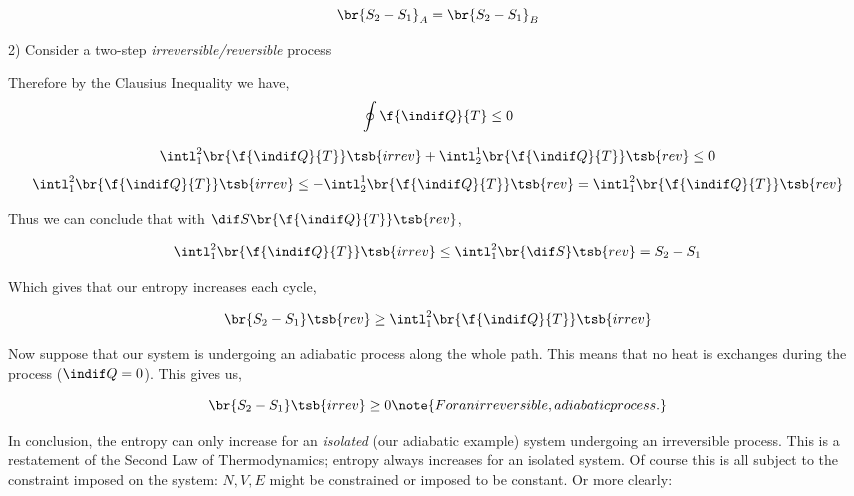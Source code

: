 \documentclass{article}
\begin{document}
\[ \br{S_2 - S_1}_A = \br{S_2 - S_1}_B \]

2) Consider a two-step \textit{irreversible/reversible} process

\begin{center}
\end{center}

Therefore by the Clausius Inequality we have,
\[ \oint \f{\indif Q}{T} \leq 0 \]

\[ \intl_1^2 \br{\f{\indif Q}{T}}\tsb{irrev} + \intl_2^1 \br{\f{\indif Q}{T}}\tsb{rev} \leq 0 \]
\[ \intl_1^2 \br{\f{\indif Q}{T}}\tsb{irrev} \leq - \intl_2^1 \br{\f{\indif Q}{T}}\tsb{rev} = \intl_1^2 \br{\f{\indif Q}{T}}\tsb{rev} \]

Thus we can conclude that with $\dif S \br{\f{\indif Q}{T}}\tsb{rev}$,

\[ \intl_1^2 \br{\f{\indif Q}{T}}\tsb{irrev} \leq \intl_1^2 \br{\dif S}\tsb{rev} = S_2 - S_1 \]

Which gives that our entropy increases each cycle,

\[ \br{S_2 - S_1}\tsb{rev} \geq \intl_1^2 \br{\f{\indif Q}{T}}\tsb{irrev} \]

Now suppose that our system is undergoing an adiabatic process along the whole path. This means that no heat is exchanges during the process ($\indif Q = 0$). This gives us,

\[ \br{S_2 - S_1}\tsb{irrev} \geq 0 \note{For an irreversible, adiabatic process.}\]

In conclusion, the entropy can only increase for an \textit{isolated} (our adiabatic example) system undergoing an irreversible process. This is a restatement of the Second Law of Thermodynamics; entropy always increases for an isolated system. Of course this is all subject to the constraint imposed on the system: $N, V, E$ might be constrained or imposed to be constant. Or more clearly: \\
\end{document}
